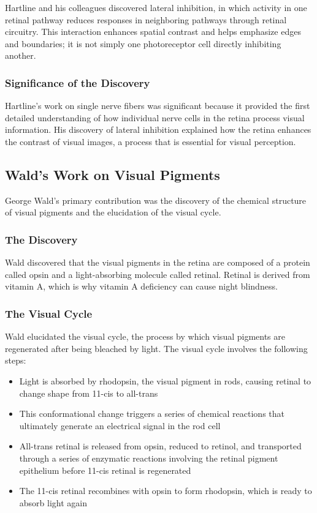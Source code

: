 Hartline and his colleagues discovered lateral inhibition, in which activity in one retinal pathway reduces responses in neighboring pathways through retinal circuitry. This interaction enhances spatial contrast and helps emphasize edges and boundaries; it is not simply one photoreceptor cell directly inhibiting another.

\subsubsection{Significance of the Discovery}

Hartline's work on single nerve fibers was significant because it provided the first detailed understanding of how individual nerve cells in the retina process visual information. His discovery of lateral inhibition explained how the retina enhances the contrast of visual images, a process that is essential for visual perception.

\subsection{Wald's Work on Visual Pigments}

George Wald's primary contribution was the discovery of the chemical structure of visual pigments and the elucidation of the visual cycle.

\subsubsection{The Discovery}

Wald discovered that the visual pigments in the retina are composed of a protein called opsin and a light-absorbing molecule called retinal. Retinal is derived from vitamin A, which is why vitamin A deficiency can cause night blindness.

\subsubsection{The Visual Cycle}

Wald elucidated the visual cycle, the process by which visual pigments are regenerated after being bleached by light. The visual cycle involves the following steps:

\begin{itemize}
\item Light is absorbed by rhodopsin, the visual pigment in rods, causing retinal to change shape from 11-cis to all-trans
\item This conformational change triggers a series of chemical reactions that ultimately generate an electrical signal in the rod cell
\item All-trans retinal is released from opsin, reduced to retinol, and transported through a series of enzymatic reactions involving the retinal pigment epithelium before 11-cis retinal is regenerated
\item The 11-cis retinal recombines with opsin to form rhodopsin, which is ready to absorb light again
\end{itemize}


